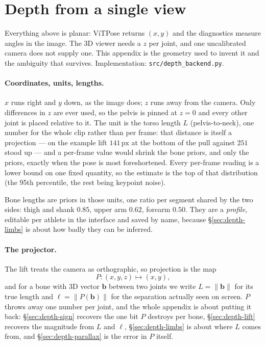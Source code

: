 \documentclass[10pt,a4paper]{article}
\newcommand{\Lt}{L}                      %
\begin{document}
\section{Depth from a single view}\label{sec:depth}

Everything above is planar: ViTPose returns $(x,y)$ and the diagnostics measure
angles in the image. The 3D viewer needs a $z$ per joint, and one uncalibrated
camera does not supply one. This appendix is the geometry used to invent it and
the ambiguity that survives. Implementation:
\texttt{src/depth\_backend.py}.

\paragraph{Coordinates, units, lengths.} $x$ runs right and $y$ down, as the
image does; $z$ runs away from the camera. Only differences in $z$ are ever
used, so the pelvis is pinned at $z=0$ and every other joint is placed relative
to it. The unit is the torso length $\Lt$ (pelvis-to-neck), one number for the
whole clip rather than per frame: that distance is itself a projection --- on
the example lift $141\,\mathrm{px}$ at the bottom of the pull against $251$
stood up --- and a per-frame value would shrink the bone priors, and only the
priors, exactly when the pose is most foreshortened. Every per-frame reading is
a lower bound on one fixed quantity, so the estimate is the top of that
distribution (the 95th percentile, the rest being keypoint noise).

Bone lengths are priors in those units, one ratio per segment shared by the two
sides: thigh and shank $0.85$, upper arm $0.62$, forearm $0.50$. They are a
\emph{profile}, editable per athlete in the interface and saved by name,
because \S\ref{sec:depth-limbs} is about how badly they can be inferred.

\paragraph{The projector.} The lift treats the camera as orthographic, so
projection is the map
\[
  P:(x,y,z)\mapsto(x,y),
\]
and for a bone with 3D vector $\mathbf{b}$ between two joints we write
$L=\lVert\mathbf{b}\rVert$ for its true length and
$\ell=\lVert P(\mathbf{b})\rVert$ for the separation actually seen on screen.
$P$ throws away one number per joint, and the whole appendix is about putting
it back: \S\ref{sec:depth-sign} recovers the one bit $P$ destroys per bone,
\S\ref{sec:depth-lift} recovers the magnitude from $L$ and $\ell$,
\S\ref{sec:depth-limbs} is about where $L$ comes from, and
\S\ref{sec:depth-parallax} is the error in $P$ itself.
\end{document}
